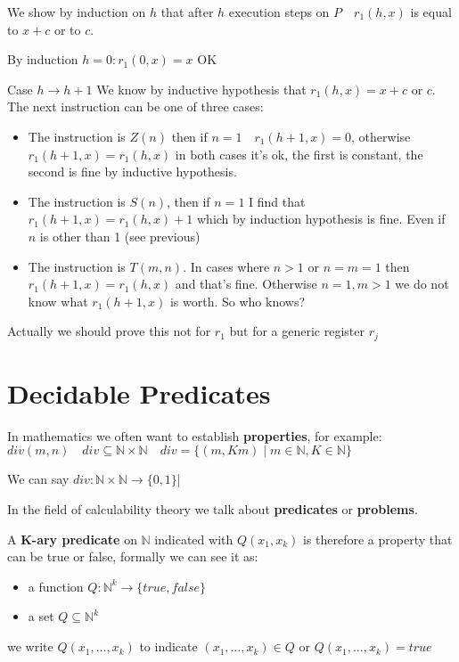 \documentclass{amsbook}
\newcommand{\nat}{\ensuremath{\mathbb{N}}}
\theoremstyle{definition}
\theoremstyle{remark}
\numberwithin{section}{chapter}
\numberwithin{equation}{chapter}
\begin{document}
We show by induction on $h$ that after $h$ execution steps on $P \quad  r_1(h,x) $ is equal to $x + c$ or to $c$.

By induction $h = 0: r_1(0,x) = x $ OK

Case $ h \rightarrow h+1 $ We know by inductive hypothesis that $ r_1(h,x) = x+c $ or $ c $. The next instruction can be one of three cases:
\begin{itemize}
	\item The instruction is $Z (n)$ then if $n = 1  \quad  r_1(h+1,x) = 0 $, otherwise $ r_1(h+1,x) = r_1(h,x) $ in both cases it's ok, the first is constant, the second is fine by inductive hypothesis.
	\item The instruction is $S (n)$, then if $n = 1$ I find that $ r_1(h+1,x) = r_1(h,x)+1 $ which by induction hypothesis is fine. Even if $n$ is other than 1 (see previous)
	\item The instruction is $T (m, n)$. In cases where $ n>1 $ or $ n=m=1 $ then $ r_1(h+1,x) = r_1(h,x) $ and that's fine. Otherwise $ n = 1, m > 1 $ we do not know what $ r_1(h+1,x) $ is worth. So who knows?
\end{itemize}

Actually we should prove this not for $ r_1 $ but for a generic register $ r_j $

\chapter {Decidable Predicates}

In mathematics we often want to establish \textbf{properties}, for example: $ div(m,n)  \quad  div \subseteq \nat \times \nat \quad  div = \{(m,Km) \mid m \in \nat, K \in \nat \} $

We can say $ div: \nat \times \nat \rightarrow \{0,1\} $|

In the field of calculability theory we talk about \textbf{predicates} or \textbf{problems}.

A \textbf{K-ary predicate} on $\nat $ indicated with $Q(x_1,x_k)$ is therefore a property that can be true or false, formally we can see it as:

\begin{itemize}
	\item a function $Q: \nat^k\rightarrow \{true,false\}$
	\item a set $Q \subseteq \nat^k$
\end{itemize}

we write $Q(x_1,\dots,x_k)$ to indicate $(x_1,\dots,x_k) \in Q$ or $Q(x_1,\dots,x_k) = true$
\end{document}
